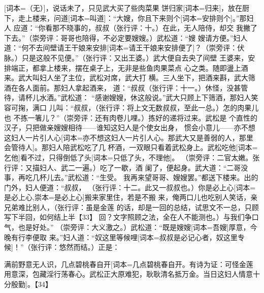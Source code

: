 \documentclass[UTF8,scheme=chinese,11pt,linespread=1.4]{ctexbook}
\makeatletter
\newcommand{\banben}[2][]{#2}
\newenvironment{diben}[1]
  {\list{}{\listparindent 2em
    \itemindent\listparindent
    \rightmargin 0em  %
    \leftmargin 0em  %
    \parsep \z@ \@plus\p@}%
   \item\relax}
  {\endlist}
\makeatother
\begin{document}
\begin{diben}
\banben{话说金莲陪着武松在楼上}[词本={（无）}]，说话未了，只见武大买了些肉菜果
饼\banben{归家}[词本={归来}]，放在厨下，走上楼来，\banben{问道}[词本={叫道}]：“大嫂，你且下来\banben{则个}[词本={安排则个}]。”那妇人
应道：“你看那不晓事的，叔叔（张行评：十。）在此，无人陪侍，却交
我撇了下去。”（崇旁评：哥哥也陪得，不必定要嫂嫂。）武松道：“嫂
嫂请方便。”妇人道：“何不去间壁\banben{请王干娘来安排}[词本={请王干娘来安排便了}]？（崇旁评：伏
脉。）只是这般不见便。”（张行评：又出王婆。）武大便自去央了间壁
王婆来，安排端正，都拿上楼来，摆在桌子上，无非是些鱼肉果菜点
心之类。随即盪上酒来。武大叫妇人坐了主位，武松对席，武大打
横。三人坐下，把酒来斟，武大筛酒在各人面前。那妇人拿起酒来，
道：“叔叔（张行评：十一。）休怪，没甚管待，请杯儿水酒。”武松道：
“感谢嫂嫂，休这般说。”武大只顾上下筛酒，那妇人笑容可掬，满口
儿叫：“叔叔，（张行评：将上文无数叔叔，至此一总。）怎的肉果儿也
不拣一箸儿？”（崇旁评：还有肉卷儿哩。）拣好的递将过来。武松是
个直性的汉子，只把做亲嫂嫂相待——谁知这妇人是个使女出身，
惯会小意儿——\banben{亦不想这妇人一片引人心}[词本={亦不想这妇人一片引人心。那武大又是善弱的人，那里会管待人}]。那妇人陪武松吃了几
杯酒，一双眼只看着武松身上。武松\banben{吃他}[词本={乞他}]看不过，\banben{只得倒低了头}[词本={只低了头，不理他}]。
（崇旁评：二官太嫩。张行评：又描妇人、武二一遍。）吃了一歇，酒
阑了，便起身。武大道：“二哥没事，再吃几杯儿去。”武松道：“生受。
我再来望哥哥、嫂嫂罢。”都送下楼来。出的门外，妇人便道：“叔叔，
（张行评：十二。此又一叔叔也。）\banben{你是必上心}[词本={是必上心},崇本={是必上心}]搬来家里住，若是不搬
来，俺两口儿也吃别人笑话，亲兄弟难比别人，（张行评：虽是金莲
的话，却是一回的总结，试思文不一总，只顾写下半回，如何结上半【33】
回？文字照顾之法，全在人不能测也。）与我们争口气，也是好处。”
（崇旁评：大义激之。）武松道：“既是\banben{嫂嫂}[词本={吾嫂}]厚意，今晚有行李便取
来。”妇人道：“\banben{奴这里等候哩}[词本={叔叔是必记心者，奴这里专候}]！”（张行评：悠然而结。）正是：

满前野意无人识，\banben{几点碧桃春自开}[词本={几点碧桃春自开。有诗为证：可怪金莲用意深，包藏淫行荡春心。武松正大原难犯，耿耿清名抵万金。当日这妇人情意十分殷勤}]。【34】

\printyiwenlist
\end{diben}
\end{document}
